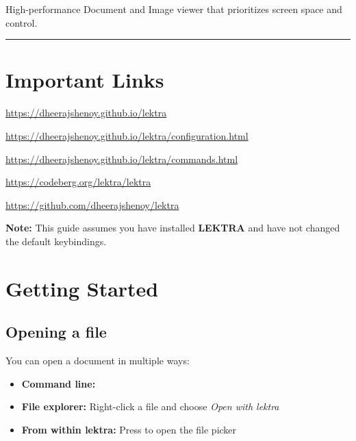 \documentclass[a4paper,12pt]{article}
\begin{document}

High-performance Document and Image viewer that prioritizes screen space and control.

\vspace{1em}
\hrule
\vspace{1em}

\section*{Important Links}

\begin{description}[
    style=nextline,
    font=\bfseries,
    leftmargin=1.2em,
    labelindent=0pt,
    itemsep=0.2em,
    parsep=0pt
]
    \item[Homepage] \url{https://dheerajshenoy.github.io/lektra}
    \item[Configuration reference] \url{https://dheerajshenoy.github.io/lektra/configuration.html}
    \item[Commands reference] \url{https://dheerajshenoy.github.io/lektra/commands.html}
    \item[Source (Codeberg)] \url{https://codeberg.org/lektra/lektra}
    \item[Source (GitHub mirror)] \url{https://github.com/dheerajshenoy/lektra}
\end{description}

\begin{ghnote}
    \textbf{Note:} This guide assumes you have installed \textbf{LEKTRA} and have not changed the default keybindings.
\end{ghnote}

\tableofcontents
\newpage

\section{Getting Started}

\subsection{Opening a file}
You can open a document in multiple ways:

\begin{itemize}[leftmargin=*]
    \item \textbf{Command line:} 
    \item \textbf{File explorer:} Right-click a file and choose \textit{Open with lektra}
    \item \textbf{From within lektra:} Press  to open the file picker
\end{itemize}
\end{document}
